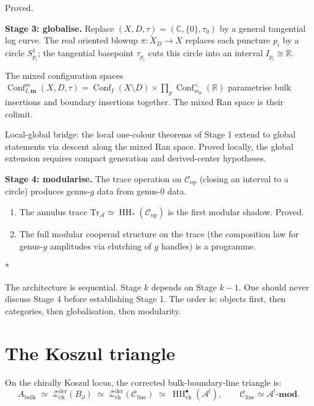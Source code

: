 \documentclass[11pt]{article}
\newcommand{\cA}{\mathcal{A}}
\newcommand{\cC}{\mathcal{C}}
\newcommand{\cZ}{\mathcal{Z}}
\newcommand{\C}{\mathbb{C}}
\newcommand{\R}{\mathbb{R}}
\newcommand{\HH}{\operatorname{HH}}
\newcommand{\Zder}{\cZ^{\mathrm{der}}_{\mathrm{ch}}}
\DeclareMathOperator{\Conf}{Conf}
\newcommand{\sep}{\bigskip\begin{center}$*$\end{center}\medskip}
\begin{document}
Proved.

\medskip

\noindent
\textbf{Stage 3: globalise.}
Replace $(X, D, \tau) = (\C, \{0\}, \tau_0)$ by a general
tangential log curve.  The real oriented blowup
$\pi\colon \widetilde{X}_D \to X$ replaces each puncture $p_i$
by a circle $S^1_{p_i}$; the tangential basepoint $\tau_{p_i}$
cuts this circle into an interval $I_{p_i} \cong \R$.

The mixed configuration spaces
$\Conf^{\mathrm{oc}}_{I,\mathbf{m}}(X, D, \tau)
= \Conf_I(X \setminus D) \times \prod_p \Conf^<_{m_p}(\R)$
parametrise bulk insertions and boundary insertions together.
The mixed Ran space is their colimit.

Local-global bridge: the local one-colour theorems of Stage 1
extend to global statements via descent along the mixed Ran space.
Proved locally, the global extension requires compact generation
and derived-center hypotheses.

\medskip

\noindent
\textbf{Stage 4: modularise.}
The trace operation on $\cC_{\mathrm{op}}$ (closing an interval
to a circle) produces genus-$g$ data from genus-$0$ data.

\begin{enumerate}[label=\textup{(\alph*)},nosep]
\item The annulus trace
  $\mathrm{Tr}_\cA \simeq \HH_*(\cC_{\mathrm{op}})$ is the
  first modular shadow.  Proved.
\item The full modular cooperad structure on the trace (the
  composition law for genus-$g$ amplitudes via clutching of $g$
  handles) is a programme.
\end{enumerate}

\sep

The architecture is sequential.  Stage $k$ depends on Stage $k-1$.
One should never discuss Stage 4 before establishing Stage 1.
The order is: objects first, then categories, then globalisation,
then modularity.


\section{The Koszul triangle}
\label{sec:koszul-triangle}

On the chirally Koszul locus, the corrected bulk-boundary-line
triangle is:
\begin{equation}\label{eq:triangle-wn}
A_{\mathrm{bulk}}
\;\simeq\;
\Zder(B_\partial)
\;\simeq\;
\Zder(\cC_{\mathrm{line}})
\;\simeq\;
\HH^\bullet_{\mathrm{ch}}(\cA^!),
\qquad
\cC_{\mathrm{line}} \simeq \cA^!\text{-}\mathbf{mod}.
\end{equation}
\end{document}
